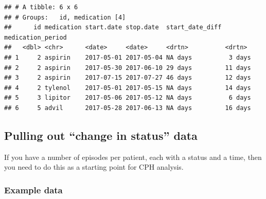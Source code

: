 \documentclass[]{book}
\begin{document}
\begin{verbatim}
## # A tibble: 6 x 6
## # Groups:   id, medication [4]
##      id medication start.date stop.date  start_date_diff medication_period
##   <dbl> <chr>      <date>     <date>     <drtn>          <drtn>           
## 1     2 aspirin    2017-05-01 2017-05-04 NA days          3 days          
## 2     2 aspirin    2017-05-30 2017-06-10 29 days         11 days          
## 3     2 aspirin    2017-07-15 2017-07-27 46 days         12 days          
## 4     2 tylenol    2017-05-01 2017-05-15 NA days         14 days          
## 5     3 lipitor    2017-05-06 2017-05-12 NA days          6 days          
## 6     5 advil      2017-05-28 2017-06-13 NA days         16 days
\end{verbatim}

\hypertarget{pulling-out-change-in-status-data}{%
\subsection{Pulling out ``change in status'' data}\label{pulling-out-change-in-status-data}}

If you have a number of episodes per patient, each with a status and a time, then you need to do this as a starting point for CPH analysis.

\hypertarget{example-data}{%
\subsubsection{Example data}\label{example-data}}
\end{document}
